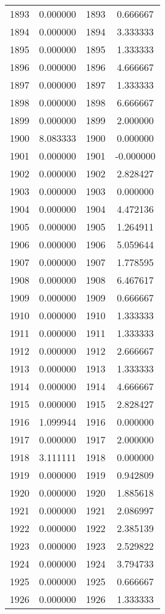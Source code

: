 \documentclass[12pt]{article}
\begin{document}
\begin{longtable}{@{}cccc@{}}
1893 & 0.000000 & 1893 & 0.666667 \\
1894 & 0.000000 & 1894 & 3.333333 \\
1895 & 0.000000 & 1895 & 1.333333 \\
1896 & 0.000000 & 1896 & 4.666667 \\
1897 & 0.000000 & 1897 & 1.333333 \\
1898 & 0.000000 & 1898 & 6.666667 \\
1899 & 0.000000 & 1899 & 2.000000 \\
1900 & 8.083333 & 1900 & 0.000000 \\
1901 & 0.000000 & 1901 & -0.000000 \\
1902 & 0.000000 & 1902 & 2.828427 \\
1903 & 0.000000 & 1903 & 0.000000 \\
1904 & 0.000000 & 1904 & 4.472136 \\
1905 & 0.000000 & 1905 & 1.264911 \\
1906 & 0.000000 & 1906 & 5.059644 \\
1907 & 0.000000 & 1907 & 1.778595 \\
1908 & 0.000000 & 1908 & 6.467617 \\
1909 & 0.000000 & 1909 & 0.666667 \\
1910 & 0.000000 & 1910 & 1.333333 \\
1911 & 0.000000 & 1911 & 1.333333 \\
1912 & 0.000000 & 1912 & 2.666667 \\
1913 & 0.000000 & 1913 & 1.333333 \\
1914 & 0.000000 & 1914 & 4.666667 \\
1915 & 0.000000 & 1915 & 2.828427 \\
1916 & 1.099944 & 1916 & 0.000000 \\
1917 & 0.000000 & 1917 & 2.000000 \\
1918 & 3.111111 & 1918 & 0.000000 \\
1919 & 0.000000 & 1919 & 0.942809 \\
1920 & 0.000000 & 1920 & 1.885618 \\
1921 & 0.000000 & 1921 & 2.086997 \\
1922 & 0.000000 & 1922 & 2.385139 \\
1923 & 0.000000 & 1923 & 2.529822 \\
1924 & 0.000000 & 1924 & 3.794733 \\
1925 & 0.000000 & 1925 & 0.666667 \\
1926 & 0.000000 & 1926 & 1.333333 \\

\end{longtable}
\end{document}
